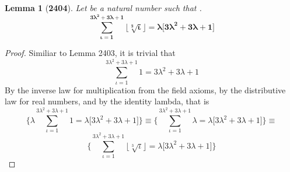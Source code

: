 \documentclass[preview]{standalone}
\newtheorem{lemma}{Lemma}
\begin{document}
\begin{lemma}[\textbf{2404}]
    Let \bm{$\iota$} be a natural number such that
    \bm{$\big \lfloor \sqrt[3] \iota \big \rfloor = \lambda$}.
    \begin{equation*}
        \bm{
            \sum_{\iota=1}^{ 3 \lambda ^2 + 3 \lambda + 1 } 
                    \big \lfloor \sqrt[3] \iota \big \rfloor
                =
            \lambda \big [ 3 \lambda ^2 + 3 \lambda + 1 \big ]
        }
    \end{equation*}
\end{lemma}

\begin{proof}
    Similiar to Lemma 2403, it is trivial that
    \begin{equation*}
        \sum_{\iota=1}^{ 3 \lambda ^2 + 3 \lambda + 1 } 
                    1
                =
            3 \lambda ^2 + 3 \lambda + 1
    \end{equation*}
    By the inverse law for multiplication from the field axioms,
    by the distributive law for real numbers, 
    and by the identity lambda, that is
    \begin{equation*}
        \Bigg \{
            \lambda \sum_{\iota=1}^{ 3 \lambda ^2 + 3 \lambda + 1 } 
                        1
                    =
            \lambda \big [ 3 \lambda ^2 + 3 \lambda + 1 \big ]
        \Bigg \}
            \equiv
        \Bigg \{
            \sum_{\iota=1}^{ 3 \lambda ^2 + 3 \lambda + 1 } 
                        \lambda
                    =
            \lambda \big [ 3 \lambda ^2 + 3 \lambda + 1 \big ]
        \Bigg \}
            \equiv
    \end{equation*}
    \begin{equation*}
        \Bigg \{
            \sum_{\iota=1}^{ 3 \lambda ^2 + 3 \lambda + 1 } 
                        \big \lfloor \sqrt[3] \iota \big \rfloor
                    =
            \lambda \big [ 3 \lambda ^2 + 3 \lambda + 1 \big ]
        \Bigg \}
    \end{equation*}
\end{proof}
\end{document}

